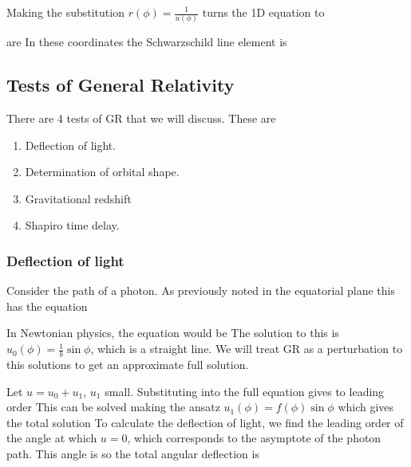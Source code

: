 \documentclass{article}
\begin{document}
\begin{lemma}
Making the substitution $r(\phi) = \frac{1}{u(\phi)}$ turns the 1D equation to 
\end{lemma}

\begin{definition}
 are 
In these coordinates the Schwarzschild line element is 
\end{definition}

\subsection{Tests of General Relativity}
There are 4 tests of GR that we will discuss. These are 
\begin{enumerate}
    \item Deflection of light.
    \item Determination of orbital shape.
    \item Gravitational redshift
    \item Shapiro time delay.
\end{enumerate}
\subsubsection{Deflection of light}
Consider the path of a photon. As previously noted in the equatorial plane this has the equation 
\begin{idea}
In Newtonian physics, the equation would be 
The solution to this is $u_0(\phi) = \frac{1}{b}\sin\phi$, which is a straight line. We will treat GR as a perturbation to this solutions to get an approximate full solution. 
\end{idea}
Let $u = u_0 + u_1$, $u_1$ small. Substituting into the full equation gives to leading order
This can be solved making the ansatz $u_1(\phi) = f(\phi) \sin\phi$
which gives the total solution 
To calculate the deflection of light, we find the leading order of the angle at which $u=0$, which corresponds to the asymptote of the photon path. This angle is 
so the total angular deflection is 
\end{document}
